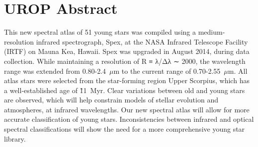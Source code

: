 \section{UROP Abstract}

This new spectral atlas of 51 young stars was compiled using a medium-resolution infrared spectrograph, Spex, at the NASA Infrared Telescope Facility (IRTF) on Mauna Kea, Hawaii.  Spex was upgraded in August 2014, during data collection.  While maintaining a resolution of R ≡ λ/Δλ ∼ 2000, the wavelength range was extended from 0.80-2.4~$\mu$m to the current range of 0.70-2.55~$\mu$m.  All atlas stars were selected from the star-forming region Upper Scorpius, which has a well-established age of \~11~Myr. Clear variations between old and young stars are observed, which will help constrain models of stellar evolution and atmospheres, at infrared wavelengths. Our new spectral atlas will allow for more accurate classification of young stars.  Inconsistencies between infrared and optical spectral classifications will show the need for a more comprehensive young star library.